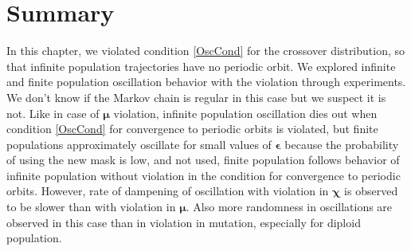 \section{Summary}
In this chapter, we violated condition \ref{OscCond} for the crossover distribution, 
so that infinite population trajectories have no periodic orbit. 
We explored infinite and finite population oscillation behavior with the violation through experiments. 
We don't know if the Markov chain is regular in this case but we suspect it is not.  
Like in case of $\bm{\mu}$ violation, infinite population oscillation dies out when condition \ref{OscCond} for convergence to 
periodic orbits is violated, but finite populations approximately oscillate for small values of $\bm{\epsilon}$ 
because the probability of using the new mask is low, and not used, 
finite population follows behavior of infinite population without violation in the condition for convergence to 
periodic orbits. However, rate of dampening of oscillation with violation 
in $\bm{\chi}$ is observed to be slower than with violation in ${\bm{\mu}}$. Also more randomness in oscillations are observed 
in this case than in violation in mutation, especially for diploid population.




